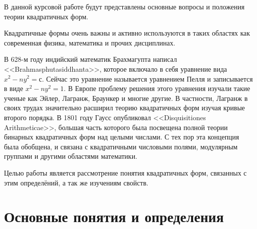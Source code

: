\documentclass[bachelor, och, coursework, times]{SCWorks}
\author{Sharov Alex}
\begin{document}








\chtitle{} 
\chname{}  

\satitle{} 
\saname{}  

\patitle{} 
\paname{}  

\term{} 

\duration{} 

\practStart{}  
\practFinish{} 

\MakeTitle




\setcounter{tocdepth}{1}

\tableofcontents

\intro
В данной курсовой работе будут представлены основные вопросы и положения теории квадратичных форм.

Квадратичные формы очень важны и активно используются в таких областях как современная физика, математика и прочих дисциплинах.

В 628-м году индийский математик Брахмагупта написал \\ <<Brahmasphutasiddhanta>>, которое включало в себя уравнение вида $x^2-ny^2=с$. Сейчас это уравнение называется уравнением Пелля и записывается в виде $x^2-ny^2=1$. В Европе проблему решения этого уравнения изучали такие ученые как Эйлер, Лагранж, Браункер и многие другие. В частности, Лагранж в своих трудах значительно расширил теорию квадратичных форм изучая кривые второго порядка. В 1801 году Гаусс опубликовал <<Disquisitiones Arithmeticae>>, большая часть которого была посвещена  полной теории бинарных квадратичных форм над целыми числами. С тех пор эта концепция была обобщена, и связана с квадратичными числовыми полями, модулярным группами и другими областями математики.

Целью работы является рассмотрение понятия квадратичных форм, связанных с этим определёний, а так же изучениям свойств. 

\section{Основные понятия и определения}
\end{document}
